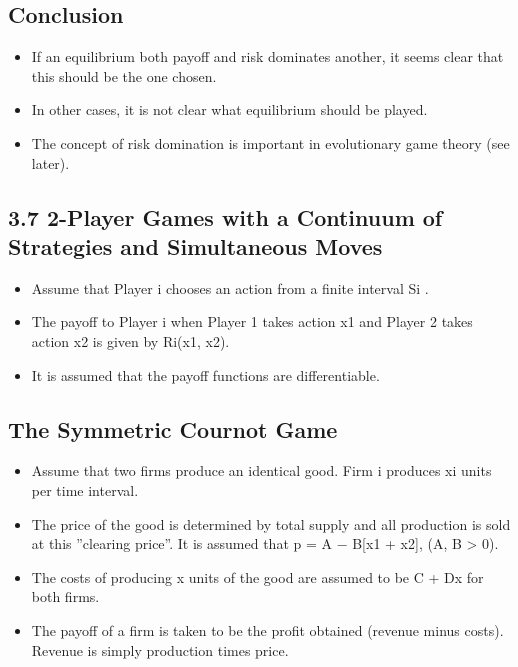 \documentclass[]{report}
\begin{document}
\subsection{Conclusion}
\begin{itemize}
	\item If an equilibrium both payoff and risk dominates another, it seems
	clear that this should be the one chosen.
	\item In other cases, it is not clear what equilibrium should be played.
	\item The concept of risk domination is important in evolutionary game
	theory (see later).
\end{itemize}

\subsection{3.7 2-Player Games with a Continuum of Strategies and
Simultaneous Moves}
\begin{itemize}
	\item Assume that Player i chooses an action from a finite interval Si
	.
\item The payoff to Player i when Player 1 takes action x1 and Player 2
	takes action x2 is given by Ri(x1, x2).
\item It is assumed that the payoff functions are differentiable.
\end{itemize}

\subsection{The Symmetric Cournot Game}
\begin{itemize}
\item Assume that two firms produce an identical good. Firm i produces
xi units per time interval.
\item The price of the good is determined by total supply and all
production is sold at this ”clearing price”. It is assumed that
p = A − B[x1 + x2], (A, B > 0).
\item The costs of producing x units of the good are assumed to be
C + Dx for both firms.
\item The payoff of a firm is taken to be the profit obtained (revenue
minus costs). Revenue is simply production times price.
\end{itemize}
\end{document}
